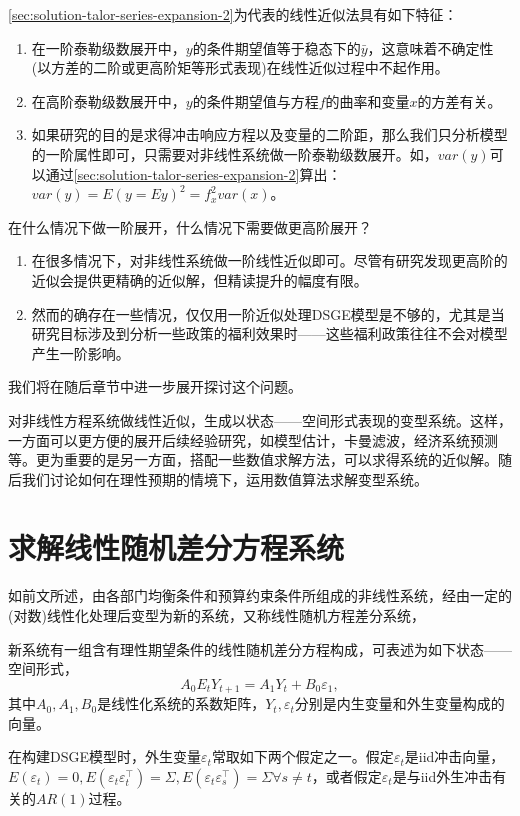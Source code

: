 \eqref{sec:solution-talor-series-expansion-2}为代表的线性近似法具有如下特征：
\begin{enumerate}
  \item 在一阶泰勒级数展开中，$y$的条件期望值等于稳态下的$\bar{y}$，这意味着不确定性(以方差的二阶或更高阶矩等形式表现)在线性近似过程中不起作用。
  \item 在高阶泰勒级数展开中，$y$的条件期望值与方程$f$的曲率和变量$x$的方差有关。
  \item 如果研究的目的是求得冲击响应方程以及变量的二阶距，那么我们只分析模型的一阶属性即可，只需要对非线性系统做一阶泰勒级数展开。如，$var(y)$可以通过\eqref{sec:solution-talor-series-expansion-2}算出：$var(y) = E(y = Ey)^2 = f_x^2 var(x)$。
\end{enumerate}

在什么情况下做一阶展开，什么情况下需要做更高阶展开？
\begin{enumerate}
  \item 在很多情况下，对非线性系统做一阶线性近似即可。尽管有研究发现更高阶的近似会提供更精确的近似解，但精读提升的幅度有限。
  \item 然而的确存在一些情况，仅仅用一阶近似处理DSGE模型是不够的，尤其是当研究目标涉及到分析一些政策的福利效果时——这些福利政策往往不会对模型产生一阶影响。
\end{enumerate}
我们将在随后章节中进一步展开探讨这个问题。

对非线性方程系统做线性近似，生成以状态——空间形式表现的变型系统。这样，一方面可以更方便的展开后续经验研究，如模型估计，卡曼滤波，经济系统预测等。更为重要的是另一方面，搭配一些数值求解方法，可以求得系统的近似解。随后我们讨论如何在理性预期的情境下，运用数值算法求解变型系统。

\section{求解线性随机差分方程系统}
如前文所述，由各部门均衡条件和预算约束条件所组成的非线性系统，经由一定的(对数)线性化处理后变型为新的系统，又称线性随机方程差分系统，

新系统有一组含有理性期望条件的线性随机差分方程构成，可表述为如下状态——空间形式，
\begin{equation}
  \label{eq:solution-lin-stho-diff-eq}
  A_0 E_t Y_{t+1} = A_1 Y_t + B_0 \varepsilon_1,
\end{equation}
其中$A_0, A_1, B_0$是线性化系统的系数矩阵，$Y_t, \varepsilon_t$分别是内生变量和外生变量构成的向量。

在构建DSGE模型时，外生变量$\varepsilon_t$常取如下两个假定之一。假定$\varepsilon_t$是iid冲击向量，$E(\varepsilon_t) = 0, E(\varepsilon_t \varepsilon_t^{\top}) = \Sigma, E(\varepsilon_t \varepsilon_s^{\top}) = \Sigma \forall s \neq t$，或者假定$\varepsilon_t$是与iid外生冲击有关的$AR(1)$过程。

